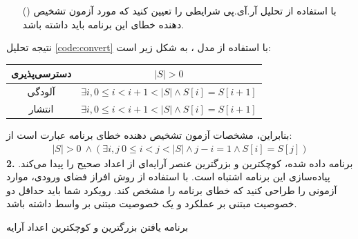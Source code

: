 \documentclass[twoside]{article}
\newenvironment{answer}{}{\medskip}
\newenvironment{question}[1]{\textbf{#1.} }{}
\newenvironment{qitem}[1]{%
	\begin{enumerate}\item[(\lr{#1})]}{\end{enumerate}}
\begin{document}
\begin{qitem}{e}
با استفاده از تحلیل آر.آی.پی شرایطی را تعیین کنید که مورد آزمون تشخیص دهنده خطای این برنامه باید داشته باشد.
\end{qitem}
\begin{answer}
نتیجه تحلیل \autoref{code:convert} با استفاده از مدل ، به شکل زیر است:

\begin{table}[h]
	\centering
	\begin{tabular}{c|c}
		دسترسی‌پذیری & $|S| > 0$\\\hline
		آلودگی & $\exists i, 0 \leq i < i + 1 < |S| \wedge S[i]=S[i+1]$\\\hline
		انتشار &
		$\exists i, 0 \leq i < i + 1 < |S| \wedge S[i]=S[i+1]$
	\end{tabular}
\end{table}
بنابراین، مشخصات آزمون تشخیص دهنده خطای برنامه عبارت است از:
\begin{align*}
	|S| > 0\ \wedge \left(\exists i, j\ 0 \leq i < j < |S| \wedge j - i = 1 \wedge S[i]=S[j]\right)
\end{align*}
\end{answer}
\begin{question}{2}
برنامه داده شده، کوچکترین و بزرگترین عنصر آرایه‌ای از اعداد صحیح را پیدا می‌کند. پیاده‌سازی این برنامه اشتباه است. با استفاده از روش افراز فضای ورودی، موارد آزمونی را طراحی کنید که خطای برنامه را مشخص کند. رویکرد شما باید حداقل دو خصوصیت مبتنی بر عملکرد و یک خصوصیت مبتنی بر واسط داشته باشد.
\end{question}
\begin{listing}[h]
	\caption{برنامه یافتن بزرگترین و کوچکترین اعداد آرایه}
	\label{code:q2}
\end{listing}
\end{document}
